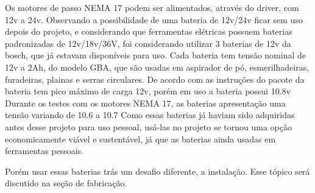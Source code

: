 Os motores de passo NEMA 17 podem ser alimentados, através do driver, com 12v a 24v.
Observando a possibilidade de uma bateria de 12v/24v ficar sem uso depois do projeto,
e considerando que ferramentas elétricas possuem baterias padronizadas de 12v/18v/36V, 
foi considerando utilizar 3 baterias de 12v da bosch, que já estavam disponíveis para uso.
Cada bateria tem tensão nominal de 12v a 2Ah, do modelo GBA, 
que são usadas em aspirador de pó, esmerilhadeiras, furadeiras, plainas e serras circulares.
De acordo com as instruções do pacote da bateria tem pico máximo de carga 12v, porém em uso a bateria possui 10.8v
Durante os testes com os motores NEMA 17,  as baterias apresentação uma tensão variando de 10.6 a 10.7
Como essas baterias já haviam sido adquiridas antes desse projeto para uso pessoal,
usá-las no projeto se tornou uma opção economicamente viável e sustentável,
já que as baterias ainda usadas em ferramentas pessoais.

Porém usar essas baterias trás um desafio diferente, a instalação.  Esse tópico será discutido na seção de fabricação.



